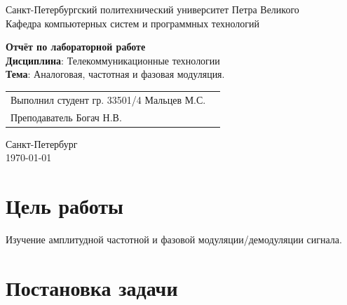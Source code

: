 \documentclass[a4paper,14pt]{extarticle}
\begin{document}
\begin{titlepage}
\centering
Санкт-Петербургский политехнический университет Петра Великого \\
\vspace{0.15cm}
Кафедра компьютерных систем и программных технологий \\
\vspace{6.5cm}

{\centering \textbf{Отчёт по лабораторной работе} \\ 
\vspace{0.15cm}
\textbf{Дисциплина}: Телекоммуникационные технологии \\
\vspace{0.15cm}
\textbf{Тема}: Аналоговая, частотная и фазовая модуляция.} \\


\vspace{6.5cm}

\begin{table}[H]
\begin{tabular}{p{\textwidth}@{}r}
{Выполнил студент гр. 33501/4} \hfill {Мальцев  М.С.} \\
{Преподаватель} \hfill {Богач Н.В.} \\
\end{tabular}
\end{table}
\vfill

{\centering Санкт-Петербург \\ 
\vspace{0.15cm}
\today}
\end{titlepage}

\tableofcontents

\newpage

\section{Цель работы}

Изучение амплитудной частотной и фазовой модуляции/демодуляции сигнала.

\section{Постановка задачи}
\end{document}
